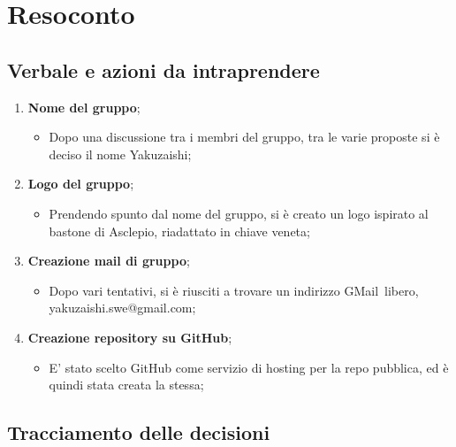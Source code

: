 \section{Resoconto}
\subsection{Verbale e azioni da intraprendere}

\begin{enumerate}
	\item \textbf{Nome del gruppo};
	\begin{itemize}
		\item Dopo una discussione tra i membri del gruppo, tra le varie proposte si è deciso il nome Yakuzaishi;
	\end{itemize}
	\item \textbf{Logo del gruppo};
	\begin{itemize}
		\item Prendendo spunto dal nome del gruppo, si è creato un logo ispirato al bastone di Asclepio, riadattato in chiave veneta;
	\end{itemize}
	\item \textbf{Creazione mail di gruppo};
	\begin{itemize}
		\item Dopo vari tentativi, si è riusciti a trovare un indirizzo GMail\glo\ libero, yakuzaishi.swe@gmail.com;
	\end{itemize}
	\item \textbf{Creazione repository su GitHub};
	\begin{itemize}
		\item E' stato scelto GitHub come servizio di hosting per la repo pubblica, ed è quindi stata creata la stessa;
	\end{itemize}

\end{enumerate}

\pagebreak

\subsection{Tracciamento delle decisioni}

